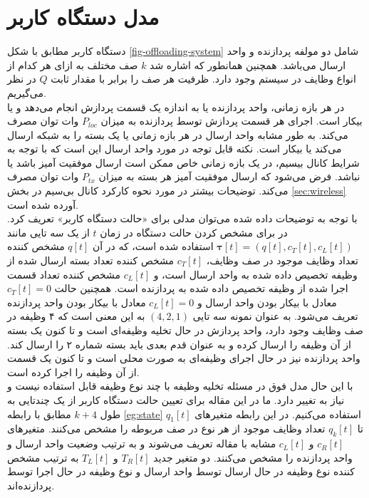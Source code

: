 \section{مدل دستگاه کاربر}
\label{sec:ue-model}
دستگاه کاربر مطابق با شکل \ref{fig-offloading-system} شامل دو مولفه پردازنده و واحد ارسال می‌باشد. همچنین همانطور که اشاره شد \(k\) صف مختلف به ازای هر کدام از انواع وظایف در سیستم وجود دارد. ظرفیت هر صف را برابر با مقدار ثابت \(Q\) در نظر می‌گیریم. \\

در هر بازه زمانی، واحد پردازنده یا به اندازه یک قسمت پردازش انجام می‌دهد و یا بیکار است. اجرای هر قسمت پردازش توسط پردازنده به میزان
\(P_{l o c}\)
وات توان مصرف می‌کند. به طور مشابه واحد ارسال در هر بازه زمانی یا یک بسته را به شبکه ارسال می‌کند یا بیکار است. نکته قابل توجه در مورد واحد ارسال این است که با توجه به شرایط کانال بیسیم، در یک بازه زمانی خاص ممکن است ارسال موفقیت آمیز باشد یا نباشد. فرض می‌شود که ارسال موفقیت آمیز هر بسته به میزان
\(P_{t x}\)
وات توان مصرف می‌کند. توضیحات بیشتر در مورد نحوه کارکرد کانال بی‌سیم در بخش \ref{sec:wireless} آورده شده است. \\

با توجه به توضیحات داده شده می‌توان مدلی برای «حالت دستگاه کاربر» تعریف کرد. در \cite{Liu} برای مشخص کردن حالت دستگاه در زمان \(t\) از یک سه تایی مانند $\boldsymbol{\tau}[t]=\left(q[t], c_{T}[t], c_{L}[t]\right)$ استفاده شده است، که در آن \(q[t]\) مشخص کننده تعداد وظایف موجود در صف وظایف، \(c_T[t]\) مشخص کننده تعداد بسته ارسال شده از وظیفه تخصیص داده شده به واحد ارسال است، و \(c_L[t]\) مشخص کننده تعداد قسمت اجرا شده از وظیفه تخصیص داده شده به پردازنده است. همچنین حالت \(c_T[t] = 0\) معادل با بیکار بودن واحد ارسال و \(c_L[t] = 0\) معادل با بیکار بودن واحد پردازنده تعریف می‌شود. به عنوان نمونه سه تایی \((4, 2, 1)\) به این معنی است که ۴ وظیفه در صف وظایف وجود دارد، واحد پردازش در حال تخلیه وظیفه‌ای است و تا کنون یک بسته از آن وظیفه را ارسال کرده و به عنوان قدم بعدی باید بسته شماره ۲ را ارسال کند. واحد پردازنده نیز در حال اجرای وظیفه‌ای به صورت محلی است و تا کنون یک قسمت از آن وظیفه را اجرا کرده است. \\
\newpage
با این حال مدل فوق در مسئله تخلیه وظیفه با چند نوع وظیفه قابل استفاده نیست و نیاز به تغییر دارد. ما در این مقاله برای تعیین حالت دستگاه کاربر از یک چندتایی به طول \(k + 4\) مطابق با رابطه \ref{eg:state} استفاده می‌کنیم. در این رابطه متغیرهای \(q_1[t]\) تا \(q_k[t]\) تعداد وظایف موجود از هر نوع در صف مربوطه را مشخص می‌کنند. متغیرهای \(c_R[t]\) و \(c_L[t]\) مشابه با مقاله \cite{Liu} تعریف می‌شوند و به ترتیب وضعیت واحد ارسال و واحد پردازنده را مشخص می‌کنند. دو متغیر جدید \(T_R[t]\) و \(T_L[t]\) به ترتیب مشخص کننده نوع وظیفه در حال ارسال توسط واحد ارسال و نوع وظیفه در حال اجرا توسط پردازنده‌اند.


